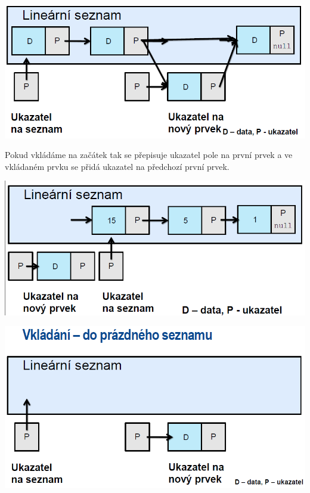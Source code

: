 \begin{center}
    
\includegraphics[scale=0.5]{BPC-TIN/images/sezins.PNG}
\end{center}

Pokud vkládáme na začátek tak se přepisuje ukazatel pole na první prvek a ve vkládaném prvku se přidá ukazatel na předchozí první prvek.

\begin{center}
\includegraphics[scale=0.5]{BPC-TIN/images/sezinsfirst.PNG}

\vspace{1cm}
\includegraphics[scale=0.5]{BPC-TIN/images/sezinsempty.PNG}
\end{center}


